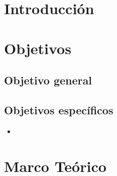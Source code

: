 \documentclass[12pt]{article}
\begin{document}
        

        \tableofcontents
        \newpage

        \section*{\centering } \vspace{.5cm}

        \section{Introducción}
                

        \section{Objetivos}
                \subsection{Objetivo general}
                        

                \subsection{Objetivos específicos}
                        \begin{itemize}
                                \item 
                        \end{itemize}


        \newpage
        \section{Marco Teórico}
                \subsection{}
                \subsection{}
                \subsection{}
\end{document}
